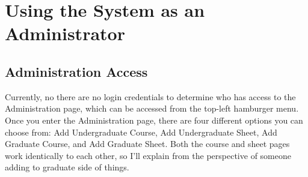 \documentclass[12pt]{article}
\begin{document}
	\pagebreak
	\section{Using the System as an Administrator}
		\subsection{Administration Access}
			Currently, no there are no login credentials to determine who has access to the Administration page, which can be accessed from the top-left hamburger menu. Once you enter the Administration page, there are four different options you can choose from: Add Undergraduate Course, Add Undergraduate Sheet, Add Graduate Course, and Add Graduate Sheet. Both the course and sheet pages work identically to each other, so I'll explain from the perspective of someone adding to graduate side of things.
		
\end{document}
